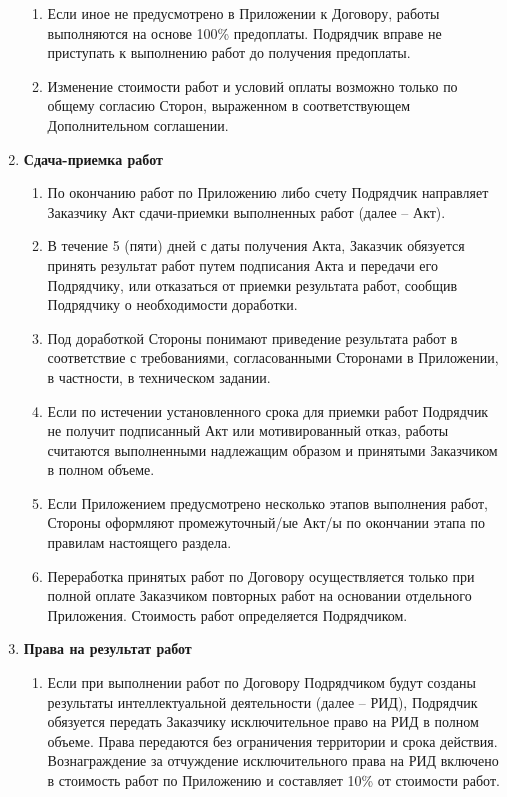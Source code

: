 \documentclass[14pt,a4paper]{article}
\begin{document}
\begin{enumerate}
\begin{enumerate}
		\item Если иное не предусмотрено в Приложении к Договору, работы выполняются на основе 100\% предоплаты. Подрядчик вправе не приступать к выполнению работ до получения предоплаты.
		
		\item Изменение стоимости работ и условий оплаты возможно только по общему согласию Сторон, выраженном в соответствующем Дополнительном соглашении.
	\end{enumerate}

	\item
	\begin{center}
	\textbf{Сдача-приемка работ}
	\end{center}
	\begin{enumerate}
		\item По окончанию работ по Приложению либо счету Подрядчик направляет Заказчику Акт сдачи-приемки выполненных работ (далее – Акт).
		
		\item В течение 5 (пяти) дней с даты получения Акта, Заказчик обязуется принять результат работ путем подписания Акта и передачи его Подрядчику, или отказаться от приемки результата работ, сообщив Подрядчику о необходимости доработки.
		
		\item Под доработкой Стороны понимают приведение результата работ в соответствие с требованиями, согласованными Сторонами в Приложении, в частности, в техническом задании.
		
		\item Если по истечении установленного срока для приемки работ Подрядчик не получит подписанный Акт или мотивированный отказ, работы считаются выполненными надлежащим образом и принятыми Заказчиком в полном объеме.
		
		\item Если Приложением предусмотрено несколько этапов выполнения работ,
		Стороны оформляют промежуточный/ые Акт/ы по окончании этапа по правилам настоящего раздела.
		
		\item Переработка принятых работ по Договору осуществляется только при полной оплате Заказчиком повторных работ на основании отдельного Приложения. Стоимость работ определяется Подрядчиком.
	\end{enumerate}

	\item
	\begin{center}
	\textbf{Права на результат работ}
	\end{center}
	\begin{enumerate}
		\item Если при выполнении работ по Договору Подрядчиком будут созданы результаты интеллектуальной деятельности (далее – РИД), Подрядчик обязуется передать Заказчику исключительное право на РИД в полном объеме. Права передаются без ограничения территории и срока действия. Вознаграждение за отчуждение исключительного права на РИД включено в стоимость работ по Приложению и составляет 10\% от стоимости работ.
		

\end{enumerate}
\end{enumerate}
\end{document}
